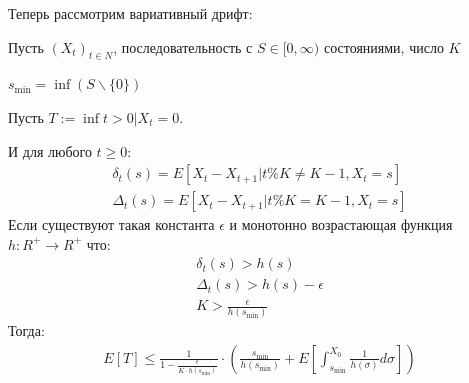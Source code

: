 \documentclass[times]{itmo-student-thesis}
\begin{document}
    Теперь рассмотрим вариативный дрифт:

    \begin{theorem}
        \label{drift:var}
        Пусть $(X_t)_{t \in N}$, последовательность с $S \in [0, \infty)$ состояниями, число $K$

        $s_{\min} = \inf(S \backslash \{0\})$

        Пусть $T := \inf{t > 0 | X_t = 0}$.

        И для любого $t \geq 0$:
        \begin{gather*}
            \delta_t(s) = E[X_t - X_{t + 1}| t \% K \neq K - 1, X_t = s] \\
            \Delta_t(s) = E[X_t - X_{t + 1}| t \% K = K - 1, X_t = s]
        \end{gather*}
        Если существуют такая константа $\epsilon$ и монотонно возрастающая функция $h : R^+ \rightarrow R^+$ что:
        \begin{gather*}
            \delta_t(s) > h(s) \\
            \Delta_t(s) > h(s) - \epsilon \\
            K > \frac{\epsilon}{h(s_{\min})}
        \end{gather*}
        Тогда:
        \begin{gather*}
            E[T] \leq \frac{1}{{1 - \frac{\epsilon}{K \cdot h(s_{\min})}}}  \cdot
            (\frac{s_{\min}}{h(s_{\min})} + E[\int_{s_{\min}}^{X_0}\frac{1}{h(\sigma)}d\sigma])
        \end{gather*}
    \end{theorem}
\end{document}
